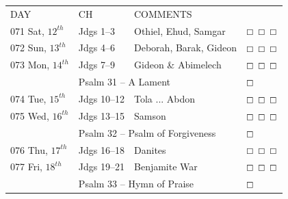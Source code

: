 \documentclass[10pt,landscape,twocolumn,letterpaper]{article}
\begin{document}
\begin{tabular}{p{0.75in}p{0.7in}p{1.8in}p{0.50in}}
  DAY & CH & COMMENTS &  \\
\tiny 071 \normalsize   \textcolor[rgb]{0.00,0.00,1.00}{Sat, $12^{th}$} & \textcolor[rgb]{0.00,0.00,1.00}{Jdgs 1--3} & \textcolor[rgb]{0.50,0.50,0.50}{\small Othiel, Ehud, Samgar} & $\boxempty$ $\boxempty$ $\boxempty$\\

\tiny 072 \normalsize  \textcolor[rgb]{0.00,0.00,1.00}{Sun, $13^{th}$} & \textcolor[rgb]{0.00,0.00,1.00}{Jdgs 4--6} & \textcolor[rgb]{0.50,0.50,0.50}{\small Deborah, Barak, Gideon} & $\boxempty$ $\boxempty$ $\boxempty$\\

\tiny 073 \normalsize \textcolor[rgb]{0.00,0.00,1.00}{Mon, $14^{th}$} & \textcolor[rgb]{0.00,0.00,1.00}{Jdgs 7--9} & \textcolor[rgb]{0.50,0.50,0.50}{\small Gideon \& Abimelech} &  $\boxempty$ $\boxempty$ $\boxempty$\\
     & \multicolumn{2}{l}{\textcolor[rgb]{1.00,0.00,0.00}{Psalm 31 -- A Lament}} & $\boxempty$ \\
    
\tiny 074 \normalsize  \textcolor[rgb]{0.00,0.00,1.00}{Tue, $15^{th}$} & \textcolor[rgb]{0.00,0.00,1.00}{Jdgs 10--12} & \textcolor[rgb]{0.50,0.50,0.50}{\small Tola ... Abdon} & $\boxempty$ $\boxempty$ $\boxempty$\\


\tiny 075 \normalsize \textcolor[rgb]{0.00,0.00,1.00}{Wed, $16^{th}$} & \textcolor[rgb]{0.00,0.00,1.00}{Jdgs 13--15} & \textcolor[rgb]{0.50,0.50,0.50}{\small Samson} & $\boxempty$ $\boxempty$ $\boxempty$\\
       & \multicolumn{2}{l}{\textcolor[rgb]{1.00,0.00,0.00}{Psalm 32 -- Psalm of Forgiveness}} & $\boxempty$ \\
       
\tiny 076 \normalsize \textcolor[rgb]{0.00,0.00,1.00}{Thu, $17^{th}$} & \textcolor[rgb]{0.00,0.00,1.00}{Jdgs 16--18} & \textcolor[rgb]{0.50,0.50,0.50}{\small Danites} &  $\boxempty$ $\boxempty$ $\boxempty$\\


\tiny 077 \normalsize \textcolor[rgb]{0.00,0.00,1.00}{Fri, $18^{th}$} & \textcolor[rgb]{0.00,0.00,1.00}{Jdgs 19--21} & \textcolor[rgb]{0.50,0.50,0.50}{\small Benjamite War} & $\boxempty$ $\boxempty$ $\boxempty$\\
       & \multicolumn{2}{l}{\textcolor[rgb]{1.00,0.00,0.00}{Psalm 33 -- Hymn of Praise}} & $\boxempty$ \\
\end{tabular} 
\end{document}
